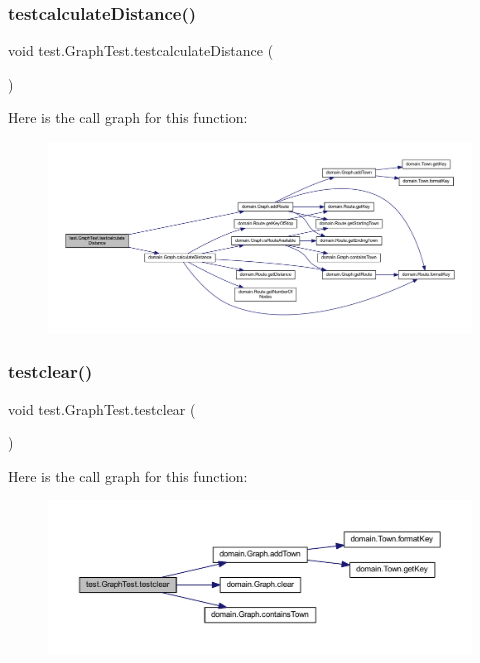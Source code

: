 \subsubsection{\texorpdfstring{testcalculate\+Distance()}{testcalculateDistance()}}
{\footnotesize\ttfamily void test.\+Graph\+Test.\+testcalculate\+Distance (\begin{DoxyParamCaption}{ }\end{DoxyParamCaption})}

Here is the call graph for this function\+:\nopagebreak
\begin{figure}[H]
\begin{center}
\leavevmode
\includegraphics[width=350pt]{classtest_1_1_graph_test_a58d63fd09c3102ebb1e07b88fd588831_cgraph}
\end{center}
\end{figure}
\mbox{\label{classtest_1_1_graph_test_a285eb6f04b41f2e1b255b387a2e88199}} 
\subsubsection{\texorpdfstring{testclear()}{testclear()}}
{\footnotesize\ttfamily void test.\+Graph\+Test.\+testclear (\begin{DoxyParamCaption}{ }\end{DoxyParamCaption})}

Here is the call graph for this function\+:\nopagebreak
\begin{figure}[H]
\begin{center}
\leavevmode
\includegraphics[width=350pt]{classtest_1_1_graph_test_a285eb6f04b41f2e1b255b387a2e88199_cgraph}
\end{center}
\end{figure}
\mbox{\label{classtest_1_1_graph_test_af2355b40a0a4852b32d3d956ec244539}} 

